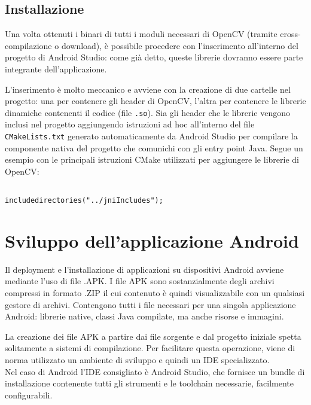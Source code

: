 \subsection{Installazione}

Una volta ottenuti i binari di tutti i moduli necessari di OpenCV (tramite cross-compilazione o download), è possibile
procedere con l'inserimento all'interno del progetto di Android Studio: come già detto, queste librerie dovranno essere 
parte integrante dell'applicazione.

L'inserimento è molto meccanico e avviene con la creazione di due cartelle nel progetto: una per contenere gli header di
OpenCV, l'altra per contenere le librerie dinamiche contenenti il codice (file \texttt{.so}).
Sia gli header che le librerie vengono inclusi nel progetto aggiungendo istruzioni ad hoc all'interno del file 
\texttt{CMakeLists.txt} generato automaticamente da Android Studio per compilare la componente nativa del progetto che
comunichi con gli entry point Java.
Segue un esempio con le principali istruzioni CMake utilizzati per aggiungere le librerie di OpenCV:

\begin{verbatim}

includedirectories("../jniIncludes");

\end{verbatim}

\section{Sviluppo dell'applicazione Android}

Il deployment e l'installazione di applicazioni su dispositivi Android avviene mediante l'uso di file .APK.
I file APK sono sostanzialmente degli archivi compressi in formato .ZIP il cui contenuto è quindi visualizzabile con
un qualsiasi gestore di archivi. Contengono tutti i file necessari per una singola applicazione Android: librerie native,
classi Java compilate, ma anche risorse e immagini.

La creazione dei file APK a partire dai file sorgente e dal progetto iniziale spetta solitamente a sistemi di compilazione.
Per facilitare questa operazione, viene di norma utilizzato un ambiente di sviluppo e quindi un IDE specializzato.\\
Nel caso di Android l'IDE consigliato è Android Studio, che fornisce un bundle di installazione contenente tutti gli strumenti
e le toolchain necessarie, facilmente configurabili.

